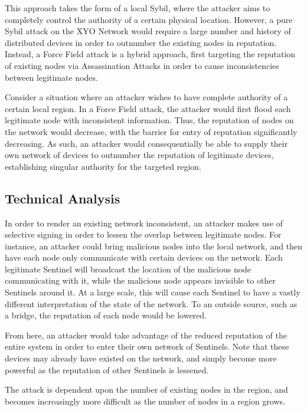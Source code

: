 \documentclass{article}
\begin{document}
This approach takes the form of a local Sybil, where the attacker aims to completely control the authority of a certain physical location. However, a pure Sybil attack on the XYO Network would require a large number and history of distributed devices in order to outnumber the existing nodes in reputation. Instead, a Force Field attack is a hybrid approach, first targeting the reputation of existing nodes via Assassination Attacks in order to cause inconsistencies between legitimate nodes.

Consider a situation where an attacker wishes to have complete authority of a certain local region. In a Force Field attack, the attacker would first flood each legitimate node with inconsistent information. Thus, the reputation of nodes on the network would decrease, with the barrier for entry of reputation significantly decreasing. As such, an attacker would consequentially be able to supply their own network of devices to outnumber the reputation of legitimate devices, establishing singular authority for the targeted region. 

\subsection{Technical Analysis}

In order to render an existing network inconsistent, an attacker makes use of selective signing in order to lessen the overlap between legitimate nodes. For instance, an attacker could bring malicious nodes into the local network, and then have each node only communicate with certain devices on the network. Each legitimate Sentinel will broadcast the location of the malicious node communicating with it, while the malicious node appears invisible to other Sentinels around it. At a large scale, this will cause each Sentinel to have a vastly different interpretation of the state of the network. To an outside source, such as a \gls{bridge}, the reputation of each node would be lowered.

From here, an attacker would take advantage of the reduced reputation of the entire system in order to enter their own network of Sentinels. Note that these devices may already have existed on the network, and simply become more powerful as the reputation of other Sentinels is lessened.

The attack is dependent upon the number of existing nodes in the region, and becomes increasingly more difficult as the number of nodes in a region grows.
\end{document}
